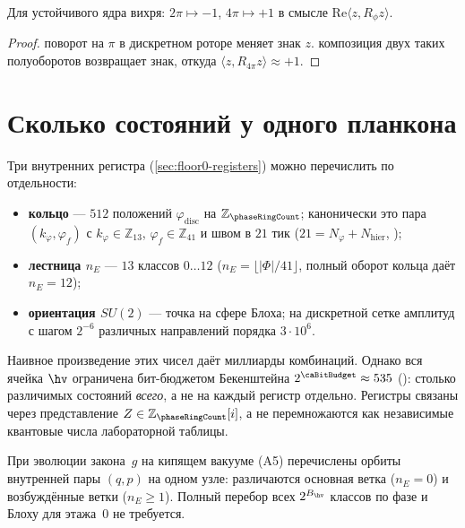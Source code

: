 \begin{proposition}
\label{prop:floor0-su2-monodromy}
Для устойчивого ядра вихря: $2\pi\mapsto -1$, $4\pi\mapsto +1$ в смысле
$\mathrm{Re}\langle z, R_\phi z\rangle$.
\end{proposition}

\begin{proof}
поворот на $\pi$ в дискретном роторе меняет знак $z$.
композиция двух таких полуоборотов возвращает знак, откуда $\langle z,R_{4\pi}z\rangle\approx+1$.
\end{proof}

\section{Сколько состояний у одного планкона}
\label{sec:floor0-catalog}

Три внутренних регистра (\cref{sec:floor0-registers}) можно перечислить по отдельности:

\begin{itemize}[noitemsep]
\item \textbf{кольцо} --- $512$ положений $\varphi_{\mathrm{disc}}$ на $\mathbb{Z}_{\phaseRingCount}$;
  канонически это пара $(k_\varphi,\varphi_f)$ с $k_\varphi\in\mathbb{Z}_{13}$,
  $\varphi_f\in\mathbb{Z}_{41}$ и швом в $21$ тик
  ($21=N_\varphi+N_{\mathrm{hier}}$, );
\item \textbf{лестница $n_E$} --- $13$ классов $0\ldots 12$
  ($n_E=\lfloor|\Phi|/41\rfloor$, полный оборот кольца даёт $n_E=12$);
\item \textbf{ориентация $SU(2)$} --- точка на сфере Блоха;
  на дискретной сетке амплитуд с шагом $2^{-6}$ различных направлений порядка $3\cdot 10^6$.
\end{itemize}

Наивное произведение этих чисел даёт миллиарды комбинаций.
Однако вся ячейка $\hv$ ограничена бит-бюджетом Бекенштейна
$2^{\caBitBudget}\approx 535$ (): столько различимых состояний
\emph{всего}, а не на каждый регистр отдельно.
Регистры связаны через представление $Z\in\mathbb{Z}_{\phaseRingCount}[i]$, а не перемножаются
как независимые квантовые числа лабораторной таблицы.

При эволюции закона~$g$ на кипящем вакууме (A5) перечислены орбиты внутренней пары $(q,p)$
на одном узле: различаются основная ветка ($n_E=0$) и возбуждённые ветки ($n_E\ge1$).
Полный перебор всех $2^{B_{\hv}}$ классов по фазе и Блоху для этажа~0 не требуется.

